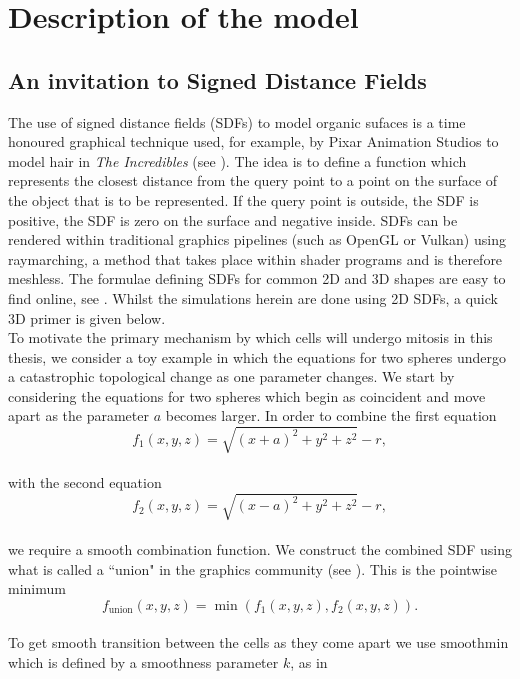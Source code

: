 \chapter{ Description of the model \label{ch:numero_uno}}
\section{An invitation to Signed Distance Fields}
The use of signed distance fields (SDFs) to model organic sufaces
is a time honoured graphical technique used, for example, by Pixar
Animation Studios to model hair in \textit{The Incredibles} 
(see \cite{petrovic2005volumetric}). The idea is to define a 
function which represents the closest distance from the query point
to a point on the surface of the object that is to be represented. 
If the query point is outside, the SDF is positive,
the SDF is zero on the surface and negative inside. SDFs can be 
rendered within traditional graphics pipelines (such as OpenGL or Vulkan)
using raymarching, a method that takes place within shader programs and 
is therefore meshless. The formulae defining SDFs for common 2D and 3D 
shapes are easy to find online, see \cite{key}. Whilst the simulations 
herein are done using 2D SDFs, a quick 3D primer is given below.
\\
To motivate the primary mechanism by which cells will undergo mitosis 
in this thesis, we consider a toy example in which the equations for 
two spheres undergo a catastrophic topological change as one parameter 
changes. We start by considering the equations for two spheres which 
begin as coincident and move apart as the parameter $a$ becomes larger. 
In order to combine the first equation
\\
\begin{equation*}
    f_1(x,y,z) =  \sqrt{ (x+a)^2+y^2+z^2 } -r,
\end{equation*}
\\
with the second equation
\\
\begin{equation*}
    f_2(x,y,z) =  \sqrt{(x-a)^2+y^2+z^2 } - r,
\end{equation*}
\\
we require a smooth combination function. We construct the combined SDF
using what is called a ``union" in the graphics community 
(see \cite{fusekvisualization}). This is the pointwise minimum 
\\
\begin{equation*}
    f_{\textrm{union}}(x,y,z) = \min(f_1(x,y,z), f_2(x,y,z)).
\end{equation*}
\\
To get smooth transition between the cells as they come apart we use 
$\textrm{smoothmin}$ which is defined by a smoothness parameter $k$, as in

